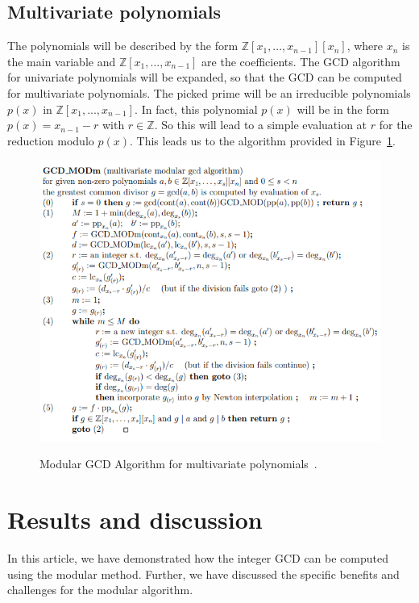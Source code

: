 \subsection{Multivariate polynomials}

The polynomials will be described by the form $\mathbb{Z}[x_1 , ... , x_{n-1}][x_n]$, where $x_n$ is the main variable and $\mathbb{Z}[x_1, ..., x_{n-1}]$ are the coefficients. The GCD algorithm for univariate polynomials will be expanded, so that the GCD can be computed for multivariate polynomials. The picked prime will be an irreducible polynomials $p(x)$ in $\mathbb{Z}[x_1, ..., x_{n-1}]$. In fact, this polynomial $p(x)$ will be in the form \mbox{$p(x) = x_{n-1} - r$} with \mbox{$r \in \mathbb{Z}$}. So this will lead to a simple evaluation at $r$ for the reduction modulo $p(x)$. This leads us to the algorithm provided in Figure~\ref{fig:GCDMulti}.

\begin{figure}
\caption{Modular GCD Algorithm for multivariate polynomials~\cite{winkler1996}.}
\centering
\includegraphics[scale=0.6]{texfiles/multivariate.PNG}
 \label{fig:GCDMulti}
\end{figure}

\section{Results and discussion}\label{results}

In this article, we have demonstrated how the integer GCD can be computed using the modular method. Further, we have discussed the specific benefits and challenges for the modular algorithm.

